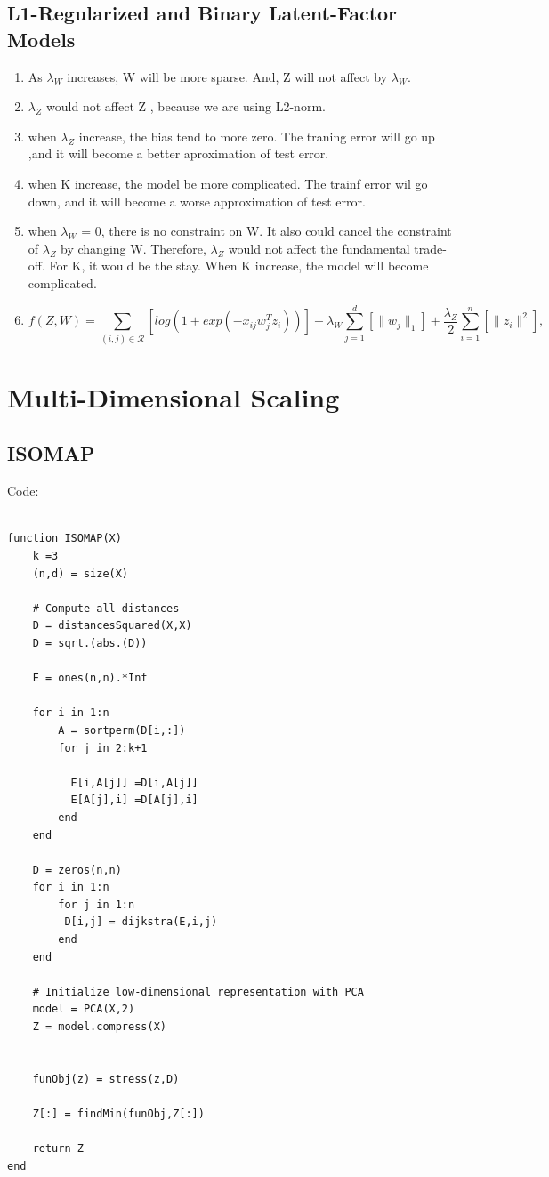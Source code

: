 \documentclass{article}
\def\norm#1{\|#1\|}
\def\enum#1{\begin{enumerate}#1\end{enumerate}}
\begin{document}
\subsection{L1-Regularized and Binary Latent-Factor Models}

\enum{
\item As $\lambda_W$ increases, W will be more sparse. And, Z will not affect by $\lambda_W$.
\item $\lambda_Z$ would not affect Z , because we are using L2-norm.
\item when $\lambda_Z$ increase,  the bias tend to more zero. The traning error will go up ,and it will become a better aproximation of test error.
\item when K increase, the model be more complicated. The trainf error wil go down, and it will become a worse approximation of test error.
\item when $\lambda_W$ = 0, there is no constraint on W. It also could cancel the constraint of $\lambda_Z$ by changing W. Therefore, $\lambda_Z$ would not affect the fundamental trade-off. For K, it would be the stay. When K increase, the model will become complicated.
\item \[
f(Z,W) = \sum_{(i,j) \in \mathcal{R}}\left[log(1 + exp(-x_{ij} w_j^Tz_i )) \right] + \lambda_W \sum_{j=1}^d \left[\norm{w_j}_1\right] + \frac{\lambda_Z}{2} \sum_{i=1}^n \left[\norm{z_i}^2\right],
\]
}



\section{Multi-Dimensional Scaling}

\subsection{ISOMAP}

Code:
\begin{verbatim}

function ISOMAP(X)
    k =3
    (n,d) = size(X)

    # Compute all distances
    D = distancesSquared(X,X)
    D = sqrt.(abs.(D))

    E = ones(n,n).*Inf

    for i in 1:n
        A = sortperm(D[i,:])
        for j in 2:k+1
          
          E[i,A[j]] =D[i,A[j]]
          E[A[j],i] =D[A[j],i]     
        end 
    end

    D = zeros(n,n)
    for i in 1:n
        for j in 1:n
         D[i,j] = dijkstra(E,i,j)
        end
    end

    # Initialize low-dimensional representation with PCA
    model = PCA(X,2)
    Z = model.compress(X)
    

    funObj(z) = stress(z,D)

    Z[:] = findMin(funObj,Z[:])

    return Z
end

\end{verbatim}
\end{document}
